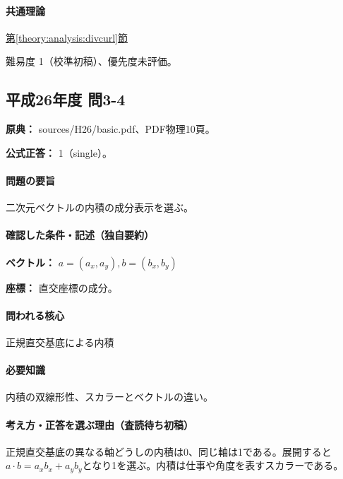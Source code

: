 \paragraph{共通理論} \hyperref[theory:analysis:divcurl]{第\ref*{theory:analysis:divcurl}節}

\par 難易度 1（校準初稿）、優先度未評価。

\subsection{平成26年度 問3-4}
\label{q:h26-reg-basic-3-4}

\noindent\textbf{原典：} sources/H26/basic.pdf、PDF物理10頁。

\textbf{公式正答：} 1（single）。

\paragraph{問題の要旨} 二次元ベクトルの内積の成分表示を選ぶ。

\paragraph{確認した条件・記述（独自要約）}\mbox{}\par

\noindent\textbf{ベクトル：} \(a=(a_x,a_y),b=(b_x,b_y)\)\par

\noindent\textbf{座標：} 直交座標の成分。\par

\paragraph{問われる核心} 正規直交基底による内積

\paragraph{必要知識} 内積の双線形性、スカラーとベクトルの違い。

\paragraph{考え方・正答を選ぶ理由（査読待ち初稿）} 正規直交基底の異なる軸どうしの内積は0、同じ軸は1である。展開すると\(a\cdot b=a_xb_x+a_yb_y\)となり1を選ぶ。内積は仕事や角度を表すスカラーである。

